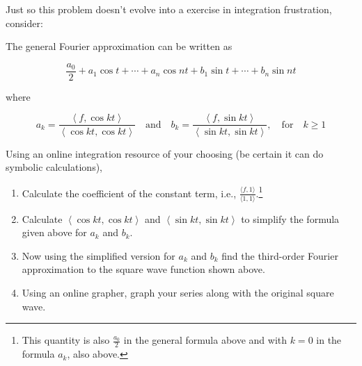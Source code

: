 \documentclass[letter,11pt]{article}
\theoremstyle{definition}
\begin{document}
Just so this problem doesn't evolve into a exercise in integration frustration, consider:

The general Fourier approximation can be written as

$$\frac{a_{0}}{2}+a_{1} \cos t+\cdots+a_{n} \cos n t+b_{1} \sin t+\cdots+b_{n} \sin n t $$

where

$$a_{k}=\frac{\left\langle f, \cos k t \right\rangle}{\left\langle \cos k t, \cos k t \right\rangle} \quad \text{and} \quad b_{k}=\frac{\left\langle f, \sin k t \right\rangle}{\left\langle \sin k t, \sin k t \right\rangle}, \quad \text{for} \quad k \geq 1$$

Using an online integration resource of your choosing (be certain it can do symbolic calculations),

\begin{enumerate}[label = \roman*.]
    \item Calculate the coefficient of the constant term, i.e., $\displaystyle \frac{\langle f, 1\rangle}{\langle 1,1\rangle}$.\footnote{This quantity is also $\frac{a_{0}}{2}$ in the general formula above and with $k=0$ in the formula $a_{k}$, also above.}
    
    \item Calculate $\left\langle \cos k t, \cos k t \right\rangle$  and $\left\langle \sin k t, \sin k t \right\rangle$  to simplify the formula given above for $a_{k}$ and $b_{k}$.
   
    \item Now using the simplified version for $a_{k}$ and $b_{k}$ find the third-order Fourier approximation to the square wave function shown above.
    
    \item Using an online grapher, graph your series along with the original square wave.
    
\end{enumerate}
\end{document}
